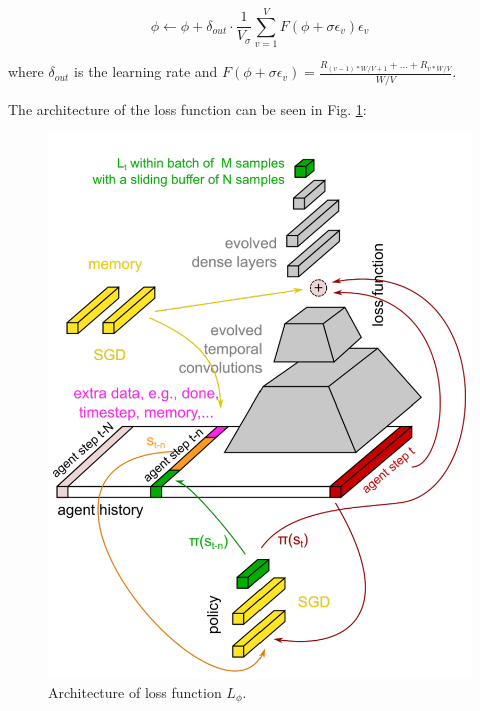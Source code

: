 \[\phi\gets\phi+\delta_{out}\cdot\frac{1}{V_\sigma}\sum_{v=1}^{V}F(\phi+\sigma\epsilon_v)\epsilon_v\]

where $\delta_{out}$ is the learning rate and $F(\phi+\sigma\epsilon_v) = \frac{R_{(v-1)*W/V+1}+...+R_{v*W/V}}{W/V}$.

\par
The architecture of the loss function can be seen in Fig. \ref{loss-architecture}:
\begin{figure}
	\includegraphics[scale=0.5]{loss-architecture.png}
	\centering
	\caption{Architecture of loss function $L_\phi$.}
	\label{loss-architecture}
\end{figure}

